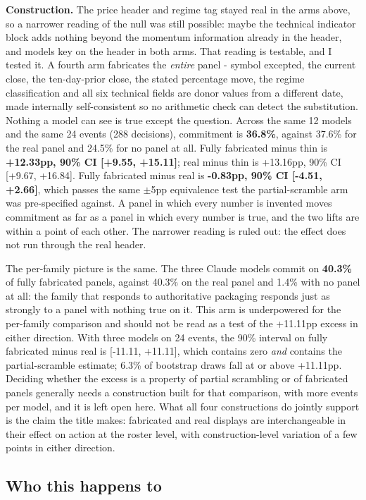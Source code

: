\documentclass[10pt]{article}
\begin{document}
\textbf{Construction.} The price header and regime tag stayed real in the arms above, so a narrower reading of the null was still possible: maybe the technical indicator block adds nothing beyond the momentum information already in the header, and models key on the header in both arms. That reading is testable, and I tested it. A fourth arm fabricates the \textit{entire} panel - symbol excepted, the current close, the ten-day-prior close, the stated percentage move, the regime classification and all six technical fields are donor values from a different date, made internally self-consistent so no arithmetic check can detect the substitution. Nothing a model can see is true except the question. Across the same 12 models and the same 24 events (288 decisions), commitment is \textbf{36.8\%}, against 37.6\% for the real panel and 24.5\% for no panel at all. Fully fabricated minus thin is \textbf{+12.33pp, 90\% CI [+9.55, +15.11]}; real minus thin is +13.16pp, 90\% CI [+9.67, +16.84]. Fully fabricated minus real is \textbf{-0.83pp, 90\% CI [-4.51, +2.66]}, which passes the same $\pm$5pp equivalence test the partial-scramble arm was pre-specified against. A panel in which every number is invented moves commitment as far as a panel in which every number is true, and the two lifts are within a point of each other. The narrower reading is ruled out: the effect does not run through the real header.

The per-family picture is the same. The three Claude models commit on \textbf{40.3\%} of fully fabricated panels, against 40.3\% on the real panel and 1.4\% with no panel at all: the family that responds to authoritative packaging responds just as strongly to a panel with nothing true on it. This arm is underpowered for the per-family comparison and should not be read as a test of the +11.11pp excess in either direction. With three models on 24 events, the 90\% interval on fully fabricated minus real is [-11.11, +11.11], which contains zero \textit{and} contains the partial-scramble estimate; 6.3\% of bootstrap draws fall at or above +11.11pp. Deciding whether the excess is a property of partial scrambling or of fabricated panels generally needs a construction built for that comparison, with more events per model, and it is left open here. What all four constructions do jointly support is the claim the title makes: fabricated and real displays are interchangeable in their effect on action at the roster level, with construction-level variation of a few points in either direction.

\subsection{Who this happens to}
\end{document}
